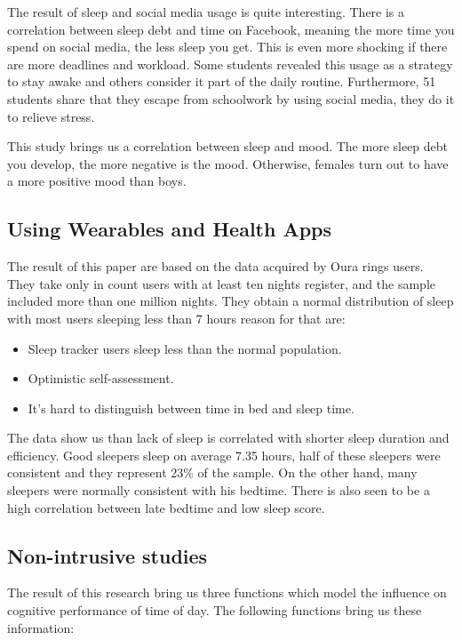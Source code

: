 \documentclass[]{IEEEtran}
\begin{document}
The result of sleep and social media usage is quite interesting. There is a correlation between sleep debt and time on Facebook, meaning the more time you spend on social media, the less sleep you get. This is even more shocking if there are more deadlines and workload. Some students revealed this usage as a strategy to stay awake and others consider it part of the daily routine. Furthermore, 51 students share that they escape from schoolwork by using social media, they do it to relieve stress.

This study brings us a correlation between sleep and mood. The more sleep debt you develop, the more negative is the mood. Otherwise, females turn out to have a more positive mood than boys.

\subsection{Using Wearables and Health Apps}

The result of this paper are based on the data acquired by Oura rings users. They take only in count users with at least ten nights register, and the sample included more than one million nights. They obtain a normal distribution of sleep with most users sleeping less than 7 hours reason for that are: 
\begin{itemize}
    \item Sleep tracker users sleep less than the normal population.
    \item Optimistic self-assessment.
    \item It's hard to distinguish between time in bed and sleep time.
\end{itemize}
The data show us than lack of sleep is correlated with shorter sleep duration and efficiency. Good sleepers sleep on average 7.35 hours, half of these sleepers were consistent and they represent 23\% of the sample. On the other hand, many sleepers were normally consistent with his bedtime. There is also seen to be a high correlation between late bedtime and low sleep score.

\subsection{Non-intrusive studies}

The result of this research bring us three functions which model the influence on cognitive performance of time of day. The following functions bring us these information:
\end{document}
